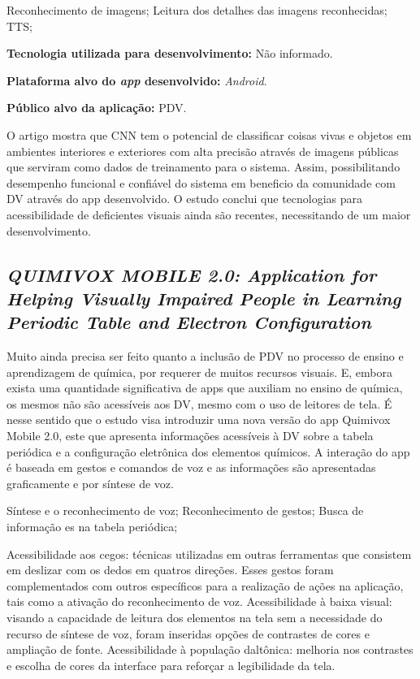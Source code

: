 Reconhecimento de imagens;
Leitura dos detalhes das imagens reconhecidas;
TTS;

\textbf{Tecnologia utilizada para desenvolvimento:} Não informado.

\textbf{Plataforma alvo do \emph{app} desenvolvido:} \emph{Android}.

\textbf{Público alvo da aplicação:} PDV\@.

O artigo mostra que CNN tem o potencial de classificar coisas vivas e objetos em ambientes interiores e exteriores com alta precisão através de imagens públicas que serviram como dados de treinamento para o sistema.
Assim, possibilitando desempenho funcional e confiável do sistema em beneficio da comunidade com DV através do app desenvolvido.
O estudo conclui que tecnologias para acessibilidade de deficientes visuais ainda são recentes, necessitando de um maior desenvolvimento.

\subsection{\emph{QUIMIVOX MOBILE 2.0: Application for Helping Visually Impaired People in Learning Periodic Table and Electron Configuration}}

Muito ainda precisa ser feito quanto a inclusão de PDV no processo de ensino e aprendizagem de química, por requerer de muitos recursos visuais.
E, embora exista uma quantidade significativa de apps que auxiliam no ensino de química, os mesmos não são acessíveis aos DV, mesmo com o uso de leitores de tela.
É nesse sentido que o estudo visa introduzir uma nova versão do app Quimivox Mobile 2.0, este que apresenta informações acessíveis à DV sobre a tabela periódica e a configuração eletrônica dos elementos químicos.
A interação do app é baseada em gestos e comandos de voz e as informações são apresentadas graficamente e por síntese de voz.

Síntese e o reconhecimento de voz;
Reconhecimento de gestos;
Busca de informação es na tabela periódica;

Acessibilidade aos cegos: técnicas utilizadas em outras ferramentas que consistem em deslizar com os dedos em quatros direções.
Esses gestos foram complementados com outros específicos para a realização de ações na aplicação, tais como a ativação do reconhecimento de voz.
Acessibilidade à baixa visual: visando a capacidade de leitura dos elementos na tela sem a necessidade do recurso de síntese de voz, foram inseridas opções de contrastes de cores e ampliação de fonte.
Acessibilidade à população daltônica: melhoria nos contrastes e escolha de cores da interface para reforçar a legibilidade da tela.

